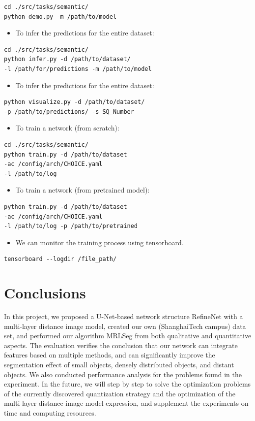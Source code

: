 \documentclass[final]{cvpr}
\begin{document}
\begin{lstlisting}
cd ./src/tasks/semantic/
python demo.py -m /path/to/model
\end{lstlisting}
\begin{itemize}
    \item To infer the predictions for the entire dataset:
\end{itemize}
\begin{lstlisting}
cd ./src/tasks/semantic/
python infer.py -d /path/to/dataset/ 
-l /path/for/predictions -m /path/to/model
\end{lstlisting}
\begin{itemize}
    \item To infer the predictions for the entire dataset:
\end{itemize}
\begin{lstlisting}
python visualize.py -d /path/to/dataset/ 
-p /path/to/predictions/ -s SQ_Number
\end{lstlisting}
\begin{itemize}
    \item To train a network (from scratch):
\end{itemize}
\begin{lstlisting}
cd ./src/tasks/semantic/
python train.py -d /path/to/dataset 
-ac /config/arch/CHOICE.yaml 
-l /path/to/log
\end{lstlisting}
\begin{itemize}
    \item To train a network (from pretrained model):
\end{itemize}
\begin{lstlisting}
python train.py -d /path/to/dataset 
-ac /config/arch/CHOICE.yaml 
-l /path/to/log -p /path/to/pretrained
\end{lstlisting}
\begin{itemize}
    \item We can monitor the training process using tensorboard.
\end{itemize}
\begin{lstlisting}
tensorboard --logdir /file_path/
\end{lstlisting}


\section{Conclusions}
In this project, we proposed a U-Net-based network structure RefineNet with a multi-layer distance image model, created our own (ShanghaiTech campus) data set, and performed our algorithm MRLSeg from both qualitative and quantitative aspects.  The evaluation verifies the conclusion that our network can integrate features based on multiple methods, and can significantly improve the segmentation effect of small objects, densely distributed objects, and distant objects.  We also conducted performance analysis for the problems found in the experiment.  In the future, we will step by step to solve the optimization problems of the currently discovered quantization strategy and the optimization of the multi-layer distance image model expression, and supplement the experiments on time and computing resources.
\end{document}
